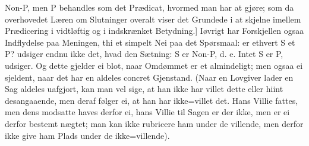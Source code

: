 \documentclass[12pt]{book}
\def\textit#1{#1}%
\begin{document}
\textit{Non-P}, men \textit{P} behandles som det Prædicat, hvormed man har at gjøre; som da
overhovedet Læren om Slutninger overalt viser det Grundede i at skjelne imellem Prædicering
i vidtløftig og i indskrænket Betydning.] Iøvrigt har Forskjellen ogsaa Indflydelse paa
Meningen, thi et simpelt Nei paa det Spørsmaal: er ethvert \textit{S} et \textit{P}?
udsiger endnu ikke det, hvad den Sætning: \textit{S} er \textit{Non-P}, d. e. Intet
\textit{S} er \textit{P}, udsiger. Og dette gjelder ei blot, naar Omdømmet er et
almindeligt; men ogsaa ei sjeldent, naar det har en aldeles \textit{concret} Gjenstand.
(Naar en Lovgiver lader en Sag aldeles uafgjort, kan man vel sige, at han ikke har villet
dette eller hiint desangaaende, men deraf følger ei, at han har ikke=villet det. Hans
Villie fattes, men dens modsatte haves derfor ei, hans Villie til Sagen er der ikke, men er
ei derfor bestemt nægtet; man kan ikke \textit{rubricere} ham under de villende, men derfor
ikke give ham Plads under de ikke=villende).
\end{document}
